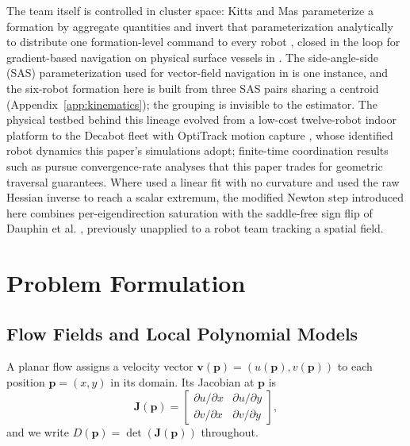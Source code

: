 \documentclass[lettersize,journal]{IEEEtran}
\begin{document}
The team itself is controlled in cluster space: Kitts and Mas
parameterize a formation by aggregate quantities and invert that
parameterization analytically to distribute one formation-level command
to every robot \cite{30}, closed in the loop for gradient-based
navigation on physical surface vessels in \cite{31}. The
side-angle-side (SAS) parameterization used for vector-field navigation
in \cite{14} is one instance, and the six-robot formation here is built
from three SAS pairs sharing a centroid
(Appendix~\ref{app:kinematics}); the grouping is invisible to the
estimator. The physical testbed behind this lineage evolved from a
low-cost twelve-robot indoor platform \cite{32} to the Decabot fleet
with OptiTrack motion capture \cite{33}, whose identified robot
dynamics this paper's simulations adopt; finite-time coordination
results such as \cite{34} pursue convergence-rate analyses that this
paper trades for geometric traversal guarantees. Where \cite{14} used a
linear fit with no curvature and \cite{15} used the raw Hessian inverse
to reach a scalar extremum, the modified Newton step introduced here
combines per-eigendirection saturation with the saddle-free sign flip
of Dauphin et al. \cite{35}, previously unapplied to a robot team
tracking a spatial field.


\section{Problem Formulation}
\label{sec:detj_field}

\subsection{Flow Fields and Local Polynomial Models}

A planar flow assigns a velocity vector $\mathbf{v}(\mathbf{p}) =
(u(\mathbf{p}), v(\mathbf{p}))$ to each position $\mathbf{p} = (x, y)$ in its
domain. Its Jacobian at $\mathbf{p}$ is
\begin{equation}
    \mathbf{J}(\mathbf{p}) =
    \begin{bmatrix}
        \partial u / \partial x & \partial u / \partial y \\
        \partial v / \partial x & \partial v / \partial y
    \end{bmatrix},
    \label{eq:jacobian}
\end{equation}
and we write $D(\mathbf{p}) = \det(\mathbf{J}(\mathbf{p}))$ throughout.
\end{document}
